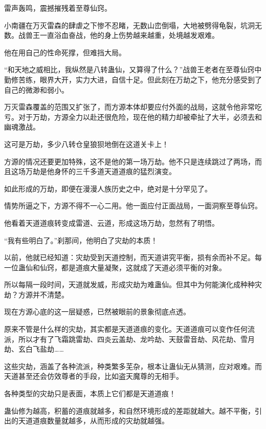 
\begin{this_body}

雷声轰鸣，震撼摧残着至尊仙窍。

小南疆在万灭雷森的肆虐之下惨不忍睹，无数山峦倒塌，大地被劈得龟裂，坑洞无数。战兽王一直浴血奋战，他的身上伤势越来越重，处境越发艰难。

他在用自己的性命死撑，但难挡大局。

“和天地之威相比，我纵然是八转蛊仙，又算得了什么？”战兽王老者在至尊仙窍中勤修苦练，眼界大开，实力大进，自信十足。但此刻在万劫之下，他充分感受到了自己的微渺和弱小。

万灭雷森覆盖的范围又扩张了，而方源本体却要应付外面的战局，这就令他非常吃亏。对于万劫，方源全力以赴还很危险，现在他的精力却被牵扯了大半，必须去和幽魂激战。

这可是万劫，多少八转仓皇狼狈地倒在这道关卡上！

方源的情况还要更加特殊，这不是他的第一场万劫。他不只是连续跳过了两场，而且这场万劫是他身怀的三千多道天道道痕的猛烈演变。

如此形成的万劫，即便在漫漫人族历史之中，绝对是十分罕见了。

情势所逼之下，方源不得不一心二用。他一面应付正面战局，一面洞察至尊仙窍。

他看着天道道痕转变成雷道、云道，形成这场万劫，忽然有了明悟。

“我有些明白了。”刹那间，他明白了灾劫的本质！

以前，他就已经知道：灾劫受到天道控制，而天道讲究平衡，损有余而补不足。每一位蛊仙和仙窍，都是道痕大量凝聚，这就成了天道必须平衡的对象。

所以每隔一段时间，天道就发威，形成灾劫为难蛊仙。但其中为何能演化成种种灾劫？方源并不清楚。

现在方源心底的这一层疑惑，已然被眼前的景象彻底点透。

原来不管是什么样的灾劫，其实都是天道道痕的变化。天道道痕可以变作任何流派，所以才有了飞霜跳雷劫、四炎云盖劫、龙吟劫、天鼓雷音劫、风花劫、雪月劫、玄白飞盐劫……

这些灾劫，涵盖了各种流派，种类繁多芜杂，根本让蛊仙无从猜测，应对艰难。而天道甚至还会仿效尊者的手段，比如盗天魔尊的无相手。

各种类型的灾劫只是表面，本质上它们都是天道道痕！

蛊仙修为越高，积蓄的道痕就越多，和自然环境形成的差距就越大。越不平衡，引出的天道道痕数量就越多，从而形成的灾劫就越强。


\end{this_body}
